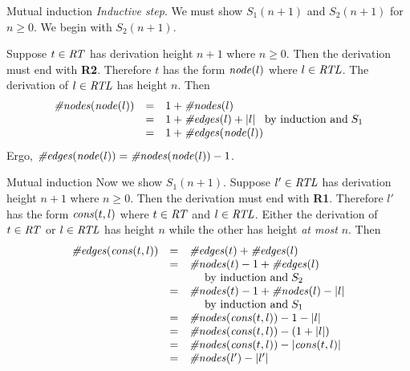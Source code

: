 \begin{wideslide}[bm=,toc=]{Mutual induction}
{\em Inductive step}.
We must show $S_1(n+1)$ and $S_2(n+1)$ for $n\geq 0$.
We begin with $S_2(n+1)$.

\vspace{1em}
Suppose $t\in\mbox{\it RT\/}$ has derivation height $n+1$ where $n\geq 0$.
Then the derivation must end with {\bf R2}. 
Therefore $t$ has the form $\mbox{\it node\/}(l)$
where $l\in\mbox{\it RTL\/}$.
The derivation of $l\in\mbox{\it RTL\/}$ has height $n$.
Then
\begin{displaymath}
\begin{array}{lll}
\mbox{\it \#nodes\/}(\mbox{\it node\/}(l)) & = & 1 + \mbox{\it \#nodes\/}(l) \\
	& = & 1+\mbox{\it \#edges\/}(l) + |l|\;\;\;\mbox{\rm by induction and}\;S_1 \\
	& = & 1+\mbox{\it \#edges\/}(\mbox{\it node\/}(l))
\end{array}
\end{displaymath}
Ergo, $\mbox{\it \#edges\/}(\mbox{\it node\/}(l))=\mbox{\it \#nodes\/}(\mbox{\it node\/}(l))-1$.
\end{wideslide}

\begin{wideslide}[bm=,toc=]{Mutual induction}
Now we show $S_1(n+1)$.
Suppose $l'\in\mbox{\it RTL\/}$ has derivation height $n+1$ where $n\geq 0$.
Then the derivation must end with {\bf R1}. 
Therefore $l'$ has the form $\mbox{\it cons\/}(t,l)$
where $t\in\mbox{\it RT\/}$ and $l\in\mbox{\it RTL\/}$.
Either the derivation of $t\in\mbox{\it RT\/}$ or $l\in\mbox{\it RTL\/}$ has height $n$ while the other 
has height {\em at most\/} $n$.
Then
\begin{displaymath}
\begin{array}{lll}
\mbox{\it \#edges\/}(\mbox{\it cons\/}(t,l)) & = & \mbox{\it \#edges\/}(t) + \mbox{\it \#edges\/}(l) \\
	& = & \mbox{\it \#nodes\/}(t) - 1 + \mbox{\it \#edges\/}(l) \\
 & & \>\>\>\>\>\>\mbox{\rm by induction and}\;S_2 \\
	& = & \mbox{\it \#nodes\/}(t) - 1 + \mbox{\it \#nodes\/}(l) - |l| \\
 & & \>\>\>\>\>\>\mbox{\rm by induction and}\;S_1 \\
	& = & \mbox{\it \#nodes\/}(\mbox{\it cons\/}(t,l)) - 1 - |l| \\
	& = & \mbox{\it \#nodes\/}(\mbox{\it cons\/}(t,l)) - (1 + |l|) \\
	& = & \mbox{\it \#nodes\/}(\mbox{\it cons\/}(t,l)) - |\mbox{\it cons\/}(t,l)|\\
	& = & \mbox{\it \#nodes\/}(l') - |l'|
\end{array}
\end{displaymath}
\end{wideslide}

